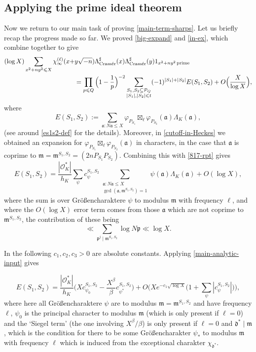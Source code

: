 \documentclass[11pt,reqno]{amsart}
\numberwithin{equation}{section}
\theoremstyle{definition}
\theoremstyle{remark}
\newcommand{\mc}{\mathcal}
\newcommand{\mf}{\mathfrak}
\renewcommand{\le}{\leqslant}
\newcommand\cramer{{\textnormal{Cram\'er}}}
\renewcommand\O{\mathcal{O}}
\begin{document}
\subsection{Applying the prime ideal theorem}
Now we return to our main task of proving \cref{main-term-sharps}. Let us briefly recap the progress made so far. We proved \cref{big-expand} and \cref{in-ex}, which combine together to give
\begin{align}\nonumber (\log X)\sum_{x^2 + ny^2\le X}
 \chi_{\infty}^{(\ell)}(x + & y \sqrt{-n})\Lambda^{\sharp}_{\cramer}  (x)\Lambda^{\sharp}_{\cramer}(y)  1_{x^2 + ny^2 \operatorname{prime}} \\ &  = \prod_{p \le Q} \Big(1 - \frac{1}{p}\Big)^{-2} \sum_{\substack{S_1, S_2 \subseteq \mc{P}_Q \\ |S_1|, |S_2| \le t}} (-1)^{|S_1| + |S_2|} E(S_1, S_2) + O\Big(\frac{X}{\log X}\Big),\label{cramer-es}\end{align}
where 
\begin{equation}\label{817-rpt}
E(S_1, S_2) := \sum_{\mf{a} : N\mf{a} \le X} \varphi_{P_{S_1}} \boxtimes_{\ell} \varphi_{P_{S_2}}(\mf{a}) \Lambda_K(\mf{a}),\end{equation}(see around \cref{es1s2-def} for the details).
Moreover, in \cref{cutoff-in-Heckes} we obtained an expansion for $\varphi_{P_{S_1}} \boxtimes_{\ell} \varphi_{P_{S_2}}(\mf{a})$ in characters, in the case that $\mf{a}$ is coprime to $\mf{m} = \mf{m}^{S_1, S_2} = (2n P_{S_1} P_{S_2})$. Combining this with \cref{817-rpt} gives
\[
    E(S_1, S_2)  = \frac{|\O^*_K|}{h_K} \sum_{\psi} c^{S_1, S_2}_{\psi} \sum_{\substack{\mf{a}: N\mf{a} \le X \\ \gcd(\mf{a}, \mf{m}^{S_1,S_2}) = 1}} \psi(\mf{a})\Lambda_K(\mf{a})  + O(\log X),
\]
where the sum is over Gr\"o{\ss}encharaktere $\psi$ to modulus $\mf{m}$ with frequency $\ell$, and where the $O(\log X)$ error term comes from those $\mf{a}$ which are not coprime to $\mf{m}^{S_1, S_2}$, the contribution of these being
\[ \ll \sum_{\mf{p}^j \mid \mf{m}^{S_1,S_2}}\log N\mf{p} \ll \log X.\]

In the following $c_1, c_2, c_3 > 0$ are absolute constants. Applying \cref{main-analytic-input} gives

\begin{equation}\label{es-1} E(S_1, S_2) =  \frac{|\O^*_K|}{h_K} \bigg( X c_{\psi_0}^{S_1, S_2}  -  \frac{X^{\beta}}{\beta}  c^{S_1,S_2}_{\psi^*} \bigg) + O \bigg( X e^{-c_1\sqrt{\log X}}\Big(1 +  \sum_{\psi} |c^{S_1, S_2}_{\psi}|\Big) \bigg), \end{equation}
where here all Gr\"o{\ss}encharaktere $\psi$ are to modulus $\mf{m} = \mf{m}^{S_1, S_2}$ and have frequency $\ell$, $\psi_0$ is the principal character to modulus $\mf{m}$ (which is only present if $\ell = 0$) and the `Siegel term'  (the one involving $X^{\beta}/\beta$) is only present if $\ell = 0$ and $\mf{d}^* \mid \mf{m}$, which is the condition for there to be some Gr\"o{\ss}encharakter $\psi_*$ to modulus $\mf{m}$ with frequency $\ell$ which is induced from the exceptional charakter $\chi_{\mf{d}^*}$. 
\end{document}
